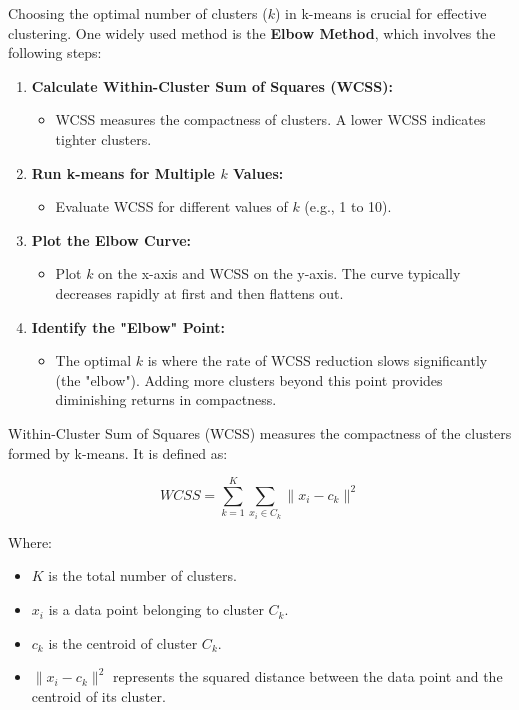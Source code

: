 \documentclass{article}
\begin{document}
Choosing the optimal number of clusters (\(k\)) in k-means is crucial for effective clustering. One widely used method is the \textbf{Elbow Method}, which involves the following steps:

\begin{enumerate}
    \item \textbf{Calculate Within-Cluster Sum of Squares (WCSS):}
    \begin{itemize}
        \item WCSS measures the compactness of clusters. A lower WCSS indicates tighter clusters.
    \end{itemize}
    \item \textbf{Run k-means for Multiple \(k\) Values:}
    \begin{itemize}
        \item Evaluate WCSS for different values of \(k\) (e.g., 1 to 10).
    \end{itemize}
    \item \textbf{Plot the Elbow Curve:}
    \begin{itemize}
        \item Plot \(k\) on the x-axis and WCSS on the y-axis. The curve typically decreases rapidly at first and then flattens out.
    \end{itemize}
    \item \textbf{Identify the "Elbow" Point:}
    \begin{itemize}
        \item The optimal \(k\) is where the rate of WCSS reduction slows significantly (the "elbow"). Adding more clusters beyond this point provides diminishing returns in compactness.
    \end{itemize}
\end{enumerate}
Within-Cluster Sum of Squares (WCSS) measures the compactness of the clusters formed by k-means. It is defined as:

\[
WCSS = \sum_{k=1}^{K} \sum_{x_i \in C_k} \|x_i - c_k\|^2
\]

Where:
\begin{itemize}
    \item \(K\) is the total number of clusters.
    \item \(x_i\) is a data point belonging to cluster \(C_k\).
    \item \(c_k\) is the centroid of cluster \(C_k\).
    \item \(\|x_i - c_k\|^2\) represents the squared distance between the data point and the centroid of its cluster.
\end{itemize}
\end{document}
